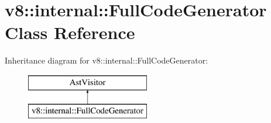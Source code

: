 \hypertarget{classv8_1_1internal_1_1_full_code_generator}{}\section{v8\+:\+:internal\+:\+:Full\+Code\+Generator Class Reference}
\label{classv8_1_1internal_1_1_full_code_generator}
Inheritance diagram for v8\+:\+:internal\+:\+:Full\+Code\+Generator\+:\begin{figure}[H]
\begin{center}
\leavevmode
\includegraphics[height=2.000000cm]{classv8_1_1internal_1_1_full_code_generator}
\end{center}
\end{figure}
